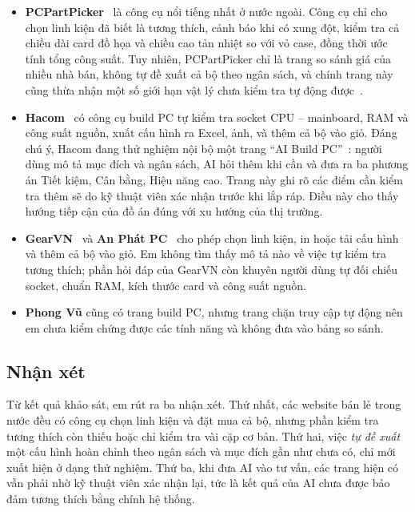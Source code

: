 \begin{itemize}
  \item \textbf{PCPartPicker}~\cite{pcpartpicker} là công cụ nổi tiếng nhất ở nước ngoài. Công cụ chỉ cho chọn linh kiện đã biết là tương thích, cảnh báo khi có xung đột, kiểm tra cả chiều dài card đồ họa và chiều cao tản nhiệt so với vỏ case, đồng thời ước tính tổng công suất. Tuy nhiên, PCPartPicker chỉ là trang so sánh giá của nhiều nhà bán, không tự đề xuất cả bộ theo ngân sách, và chính trang này cũng thừa nhận một số giới hạn vật lý chưa kiểm tra tự động được~\cite{pcpartpicker-forum}.
  \item \textbf{Hacom}~\cite{hacom-buildpc} có công cụ build PC tự kiểm tra socket CPU -- mainboard, RAM và công suất nguồn, xuất cấu hình ra Excel, ảnh, và thêm cả bộ vào giỏ. Đáng chú ý, Hacom đang thử nghiệm nội bộ một trang ``AI Build PC''~\cite{hacom-ai}: người dùng mô tả mục đích và ngân sách, AI hỏi thêm khi cần và đưa ra ba phương án Tiết kiệm, Cân bằng, Hiệu năng cao. Trang này ghi rõ các điểm cần kiểm tra thêm sẽ do kỹ thuật viên xác nhận trước khi lắp ráp. Điều này cho thấy hướng tiếp cận của đồ án đúng với xu hướng của thị trường.
  \item \textbf{GearVN}~\cite{gearvn} và \textbf{An Phát PC}~\cite{anphat} cho phép chọn linh kiện, in hoặc tải cấu hình và thêm cả bộ vào giỏ. Em không tìm thấy mô tả nào về việc tự kiểm tra tương thích; phần hỏi đáp của GearVN còn khuyên người dùng tự đối chiếu socket, chuẩn RAM, kích thước card và công suất nguồn.
  \item \textbf{Phong Vũ} cũng có trang build PC, nhưng trang chặn truy cập tự động nên em chưa kiểm chứng được các tính năng và không đưa vào bảng so sánh.
\end{itemize}

\subsection{Nhận xét}

Từ kết quả khảo sát, em rút ra ba nhận xét. Thứ nhất, các website bán lẻ trong nước đều có công cụ chọn linh kiện và đặt mua cả bộ, nhưng phần kiểm tra tương thích còn thiếu hoặc chỉ kiểm tra vài cặp cơ bản. Thứ hai, việc \emph{tự đề xuất} một cấu hình hoàn chỉnh theo ngân sách và mục đích gần như chưa có, chỉ mới xuất hiện ở dạng thử nghiệm. Thứ ba, khi đưa AI vào tư vấn, các trang hiện có vẫn phải nhờ kỹ thuật viên xác nhận lại, tức là kết quả của AI chưa được bảo đảm tương thích bằng chính hệ thống.

